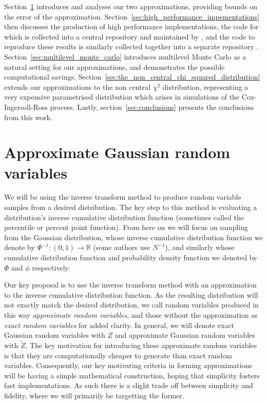\documentclass[manuscript,review]{acmart}
\begin{document}
Section~\ref{sec:approximate_gaussian_random_variables} introduces and analyses our two approximations, providing bounds on the error of the approximation. Section~\ref{sec:high_performance_impementations} then discusses the production of high performance implementations, the code for which is collected into a central repository and maintained by \citet{sheridan2020approximate_random,sheridan2020approximate_inverse}, and the code to reproduce these results is similarly collected together into a separate repository \citep{sheridan2020approximate_inverse}. Section~\ref{sec:multilevel_monte_carlo} introduces multilevel Monte Carlo as a natural setting for our approximations, and demonstrates the possible computational savings. Section~\ref{sec:the_non_central_chi_squared_distribution} extends our approximations to the non central $ \chi^2 $ distribution, representing a very expensive parametrised distribution which arises in simulations of the Cox-Ingersoll-Ross process. Lastly, section~\ref{sec:conclusions} presents the conclusions from this work. 

\section{Approximate Gaussian random variables}
\label{sec:approximate_gaussian_random_variables}

We will be using the inverse transform method \citep[2.2.1]{glasserman2013monte} to produce random variable samples from a desired distribution. The key step to this method is evaluating a distribution's inverse cumulative distribution function (sometimes called the percentile or percent point function). From here on we will focus on sampling from the Gaussian distribution, whose inverse cumulative distribution function we denote by $ \Phi^{-1} \colon (0, 1) \to \mathbb{R} $ (some authors use $ N^{-1} $), and similarly whose cumulative distribution function and probability density function we denoted by $ \Phi $ and $ \phi $ respectively. 

Our key proposal is to use the inverse transform method with an approximation to the inverse cumulative distribution function. As the resulting distribution will not exactly match the desired distribution, we call random variables produced in this way \emph{approximate random variables}, and those without the approximation as \emph{exact random variables} for added clarity. In general, we will denote exact Gaussian random variables with $ Z $ and approximate Gaussian random variables with $ \tilde{Z} $. The key motivation for introducing these approximate random variables is that they are computationally cheaper to generate than exact random variables. Consequently, our key motivating criteria in forming approximations will be having a simple mathematical construction, hoping that simplicity fosters fast implementations. As such there is a slight trade off between simplicity and fidelity, where we will primarily be targetting the former. 
\end{document}
